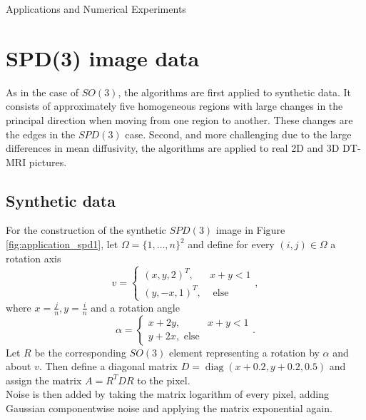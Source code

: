 \begin{chapter}{Applications and Numerical Experiments}


\FloatBarrier
\section{SPD(3) image data} %
\label{sec:SPD(3) image data}
As in the case of $SO(3)$, the algorithms are first applied to synthetic data. It consists of 
approximately five homogeneous regions with large changes in the principal direction
when moving from one region to another. These changes are the edges in the $SPD(3)$ case.
Second, and more challenging due to the large differences in mean diffusivity, the
algorithms are applied to real 2D and 3D DT-MRI pictures.


\subsection{Synthetic data} %
\label{sub:SyntheticdataSPD}
For the construction of the synthetic $SPD(3)$ image in Figure \ref{fig:application_spd1}, let $\Omega=\lbrace 1,\ldots,n \rbrace^2$ and define for every $(i,j)\in\Omega$
a rotation axis
\begin{equation}
	v = \begin{cases}
	    (x,y,2)^{T}, & x+y<1\\
	    (y,-x,1)^{T}, & \text{ else}
	\end{cases},
\end{equation}
where $x=\frac{j}{n}, y=\frac{i}{n}$ and a rotation angle
\begin{equation}
    \alpha = \begin{cases}
	   x+2y, & x+y<1\\
	   y+2x, \text{ else}
    \end{cases}.
\end{equation}
Let $R$ be the corresponding $SO(3)$ element representing a rotation by $\alpha$ and about $v$. Then define a diagonal matrix $D=\operatorname{diag}(x+0.2,y+0.2,0.5)$
and assign the matrix $A=R^{T}DR$ to the pixel.\\
Noise is then added by taking the matrix logarithm of every pixel, adding Gaussian componentwise noise and applying the matrix exponential again.
\begin{figure}[h!]
    \centering
\end{figure}
\end{chapter}
